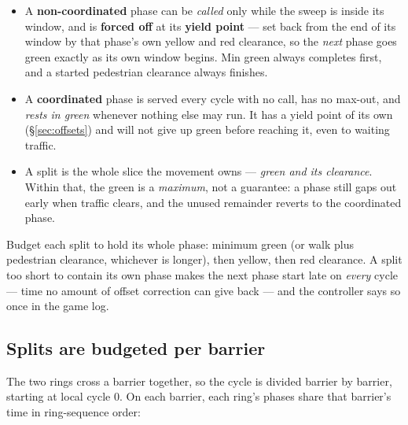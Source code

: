 \documentclass[11pt]{article}
\begin{document}
\begin{itemize}[nosep]
  \item A \textbf{non-coordinated} phase can be \emph{called} only while the sweep
        is inside its window, and is \textbf{forced off} at its \textbf{yield
        point} --- set back from the end of its window by that phase's own yellow
        and red clearance, so the \emph{next} phase goes green exactly as its own
        window begins. Min green always completes first, and a started pedestrian
        clearance always finishes.
  \item A \textbf{coordinated} phase is served every cycle with no call, has no
        max-out, and \emph{rests in green} whenever nothing else may run. It has a
        yield point of its own (\S\ref{sec:offsets}) and will not give up green
        before reaching it, even to waiting traffic.
  \item A split is the whole slice the movement owns --- \emph{green and its
        clearance}. Within that, the green is a \emph{maximum}, not a guarantee: a
        phase still gaps out early when traffic clears, and the unused remainder
        reverts to the coordinated phase.
\end{itemize}

\begin{warnbox}
Budget each split to hold its whole phase: minimum green (or walk plus pedestrian
clearance, whichever is longer), then yellow, then red clearance. A split too
short to contain its own phase makes the next phase start late on \emph{every}
cycle --- time no amount of offset correction can give back --- and the
controller says so once in the game log.
\end{warnbox}

\subsection{Splits are budgeted per barrier}\label{sec:splits}

The two rings cross a barrier together, so the cycle is divided barrier by
barrier, starting at local cycle 0. On each barrier, each ring's phases share
that barrier's time in ring-sequence order:
\end{document}
